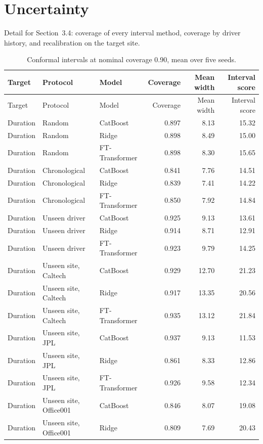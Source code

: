 \section{Uncertainty}
Detail for Section~3.4: coverage of every interval method, coverage by driver history, and recalibration on the target site.
{\footnotesize\begin{longtable}{lllrrr}
\caption{Conformal intervals at nominal coverage 0.90, mean over five seeds.}\label{tab:s-cov}\\
\toprule
Target & Protocol & Model & Coverage & Mean width & Interval score \\
\midrule
\endfirsthead
\toprule
Target & Protocol & Model & Coverage & Mean width & Interval score \\
\midrule
\endhead
\bottomrule
\endfoot
Duration & Random & CatBoost & 0.897 & 8.13 & 15.32 \\
Duration & Random & Ridge & 0.898 & 8.49 & 15.00 \\
Duration & Random & FT-Transformer & 0.898 & 8.30 & 15.65 \\
Duration & Chronological & CatBoost & 0.841 & 7.76 & 14.51 \\
Duration & Chronological & Ridge & 0.839 & 7.41 & 14.22 \\
Duration & Chronological & FT-Transformer & 0.850 & 7.92 & 14.84 \\
Duration & Unseen driver & CatBoost & 0.925 & 9.13 & 13.61 \\
Duration & Unseen driver & Ridge & 0.914 & 8.71 & 12.91 \\
Duration & Unseen driver & FT-Transformer & 0.923 & 9.79 & 14.25 \\
Duration & Unseen site, Caltech & CatBoost & 0.929 & 12.70 & 21.23 \\
Duration & Unseen site, Caltech & Ridge & 0.917 & 13.35 & 20.56 \\
Duration & Unseen site, Caltech & FT-Transformer & 0.935 & 13.12 & 21.84 \\
Duration & Unseen site, JPL & CatBoost & 0.937 & 9.13 & 11.53 \\
Duration & Unseen site, JPL & Ridge & 0.861 & 8.33 & 12.86 \\
Duration & Unseen site, JPL & FT-Transformer & 0.926 & 9.58 & 12.34 \\
Duration & Unseen site, Office001 & CatBoost & 0.846 & 8.07 & 19.08 \\
Duration & Unseen site, Office001 & Ridge & 0.809 & 7.69 & 20.43 \\

\end{longtable}}
